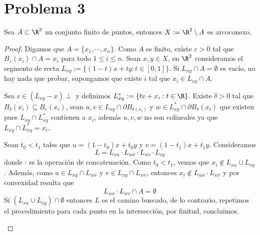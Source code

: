 \documentclass{article}
\begin{document}
\section*{Problema 3}
\begin{lema}
    Sea $A\subset\R^{2}$ un conjunto finito de puntos, entonces $X:=\R^{2}\setminus A$ es 
    arcoconexo.
\end{lema}
\begin{proof}
    Digamos que $A=\{x_{1},\cdots,x_{n}\}$. Como $A$ es finito, existe $\varepsilon>0$ tal que
    $B_{\varepsilon}(x_{i})\cap A=x_{i}$ para todo $1\leq i\leq n$. Sean $x,y\in X$, en $\R^{2}$
    consideramos el segmento de recta $L_{xy}:=\{(1-t)x+ty:t\in[0,1]\}$. Si 
    $L_{xy}\cap A=\emptyset$ es vacío, no hay nada que probar, supongamos que existe $i$ tal que
    $x_{i}\in L_{xy}\cap A$.

    \vspace{2mm}
    \noindent Sea $v\in(L_{xy}-x)\perp$ y definimos $L_{xy}^{*}:=\{tv+x_{i}:t\in\R\}$. Existe 
    $\delta>0$ tal que $\overline{B_{\delta}(x_{i})}\subseteq B_{\varepsilon}(x_{i})$, sean 
    $u,v\in L_{xy}\cap\partial B_{\delta(x_{i})}$ y $w\in L_{xy}^{*}\cap\partial 
    B_{\delta}(x_{i})$ que existen pues $L_{xy}\cap L_{xy}^{*}$ contienen a $x_{i}$, además 
    $u,v,w$ no son colineales ya que $L_{xy}\cap L_{xy}^{*}=x_{i}$.

    \vspace{2mm}
    \noindent Sean $t_{0}<t_{1}$ tales que $u=(1-t_{0})x+t_{0}y$ y $v=(1-t_{1})x+t_{1}y$. 
    Consideramos
    \begin{equation*}
        L=L_{xu}\cdot L_{uw}\cdot L_{wv}\cdot L_{vy}
    \end{equation*}
    donde $\cdot$ es la operación de concatenación. Como $t_{0}<t_{1}$, vemos que 
    $x_{i}\not\in L_{xu}\cup L_{vy}$. Además, como $u\in L_{xy}\cap L_{uw}$ y 
    $v\in L_{xy}\cap L_{wv}$, entonces $x_{i}\not\in L_{uw}\cdot L_{wv}$ y por convexidad resulta
    que
    \begin{equation*}
        L_{uw}\cdot L_{wv}\cap A=\emptyset
    \end{equation*}
    Si $(L_{xu}\cup L_{vy})\cap\emptyset$ entonces $L$ es el camino buscado, de lo contrario, 
    repetimos el procedimiento para cada punto en la intersección, por finitud, concluimos.

    \vspace{2mm}
    \begin{center}
\end{center}
\end{proof}
\end{document}

